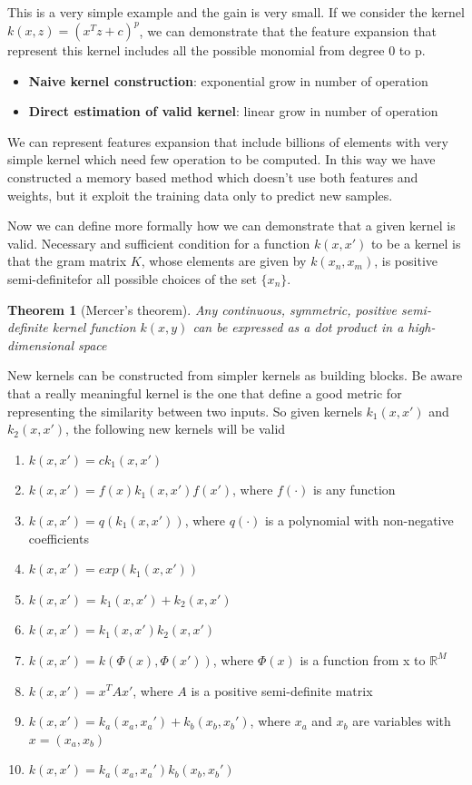 \documentclass[main.tex]{subfiles}
\newtheorem{theorem}{Theorem}[section]
\begin{document}
This is a very simple example and the gain is very small. If we consider the kernel $k(x,z) = (x^T z + c)^p$, we can demonstrate that the feature expansion that represent this kernel includes all the possible monomial from degree 0 to p.
\begin{itemize}
    \item \textbf{Naive kernel construction}: exponential grow in number of operation
    \item \textbf{Direct estimation of valid kernel}: linear grow in number of operation
\end{itemize}
We can represent features expansion that include billions of elements with very simple kernel which need few operation to be computed.
In this way we have constructed a memory based method which doesn't use both features and weights, but it exploit the training data only to predict new samples.

Now we can define more formally how we can demonstrate that a given kernel is valid.
Necessary and sufficient condition for a function $k(x, x')$ to be a kernel is that the gram matrix $K$, whose elements are given by $k(x_n, x_m)$, is positive semi-definite\footnotemark for all possible choices of the set $\{x_n\}$.
\begin{theorem}[Mercer’s theorem]
    Any continuous, symmetric, positive semi-definite kernel function $k(x, y)$ can be expressed as a dot product in a high-dimensional space
\end{theorem}
New kernels can be constructed from simpler kernels as building blocks.
Be aware that a really meaningful kernel is the one that define a good metric for representing the similarity between two inputs.
So given kernels $k_1(x,x')$ and $k_2(x,x')$, the following new kernels will be
valid
\begin{enumerate}
    \item $k(x,x') = ck_1(x,x')$
    \item $k(x,x') = f(x)k_1(x,x')f(x')$, where $f(\cdot)$ is any function
    \item $k(x,x') = q(k_1(x,x'))$, where $q(\cdot)$ is a polynomial with non-negative coefficients
    \item $k(x,x') = exp(k_1(x,x'))$
    \item $k(x,x')$ = $k_1(x,x')+k_2(x,x')$
    \item $k(x,x')=k_1(x,x')k_2(x,x')$
    \item $k(x,x')=k(\Phi(x),\Phi(x'))$, where $\Phi(x)$ is a function from x to $\mathbb{R}^M$
    \item $k(x,x') = x^TAx'$, where $A$ is a positive semi-definite matrix
    \item $k(x,x') = k_a(x_a,x_a') + k_b(x_b,x_b')$, where $x_a$ and $x_b$ are variables with $x=(x_a,x_b)$
    \item $k(x,x')=k_a(x_a,x_a') k_b(x_b,x_b')$
\end{enumerate}
\end{document}
